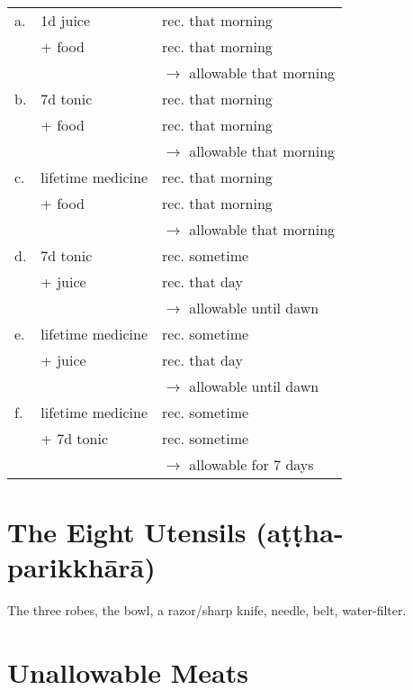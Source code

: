 \begin{tabular}{@{}lll@{}}
  a. & 1d juice & rec. that morning \\
     &  + food     & rec. that morning \\
     &             & \(\rightarrow\) allowable that morning \\
  \hline
  b. & 7d tonic & rec. that morning \\
     & + food   & rec. that morning \\
     &          & \(\rightarrow\) allowable that morning \\
  \hline
  c. & lifetime medicine & rec. that morning \\
     & + food            & rec. that morning \\
     &                   & \(\rightarrow\) allowable that morning \\
  \hline
  d. & 7d tonic & rec. sometime \\
     & + juice  & rec. that day \\
     &          & \(\rightarrow\) allowable until dawn \\
  \hline
  e. & lifetime medicine & rec. sometime \\
     & + juice           & rec. that day \\
     &                   & \(\rightarrow\) allowable until dawn \\
  \hline
  f. & lifetime medicine & rec. sometime \\
     & + 7d tonic        & rec. sometime \\
     &                   & \(\rightarrow\) allowable for 7 days \\
\end{tabular}


\ifhandbookedition
\vfill\mbox{}
\clearpage
\fi

\section*{The Eight Utensils (aṭṭha-parikkhārā)}

The three robes, the bowl, a razor/sharp knife, needle, belt, water-filter.\\
\mbox{}

\section*{Unallowable Meats}

